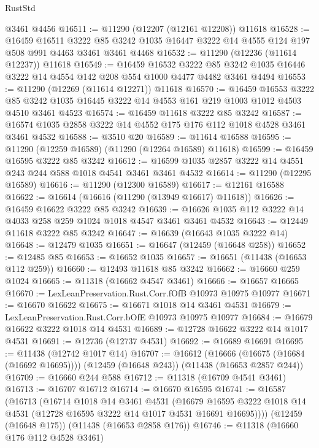 \begin{lexlean}{RustStd}
\begin{coremodule}
    @3461
    @4456
@16511 := @11290 (@12207 (@12161 @12208)) @11618
@16528 := @16459
    @16511
    @3222
    @85
    @3242
    @1035
    @16447
    @3222
    @14
    @4555
    @124
    @197
    @508
    @991
    @4463
    @3461
    @3461
    @4468
@16532 := @11290 (@12236 (@11614 @12237)) @11618
@16549 := @16459
    @16532
    @3222
    @85
    @3242
    @1035
    @16446
    @3222
    @14
    @4554
    @142
    @208
    @554
    @1000
    @4477
    @4482
    @3461
    @4494
@16553 := @11290 (@12269 (@11614 @12271)) @11618
@16570 := @16459
    @16553
    @3222
    @85
    @3242
    @1035
    @16445
    @3222
    @14
    @4553
    @161
    @219
    @1003
    @1012
    @4503
    @4510
    @3461
    @4523
@16574 := @16459 @11618 @3222 @85 @3242
@16587 := @16574 @1035 @2858 @3222 @14 @4552 @175 @176 @112 @1018 @4528 @3461 @3461 @4532
@16588 := @3510 @20
@16589 := @11614 @16588
@16595 := @11290 (@12259 @16589) (@11290 (@12264 @16589) @11618)
@16599 := @16459 @16595 @3222 @85 @3242
@16612 := @16599 @1035 @2857 @3222 @14 @4551 @243 @244 @588 @1018 @4541 @3461 @3461 @4532
@16614 := @11290 (@12295 @16589)
@16616 := @11290 (@12300 @16589)
@16617 := @12161 @16588
@16622 := @16614 (@16616 (@11290 (@13949 @16617) @11618))
@16626 := @16459 @16622 @3222 @85 @3242
@16639 := @16626 @1035 @112 @3222 @14 @4033 @258 @259 @1024 @1018 @4547 @3461 @3461 @4532
@16643 := @12449 @11618 @3222 @85 @3242
@16647 := @16639 (@16643 @1035 @3222 @14)
@16648 := @12479 @1035
@16651 := @16647 (@12459 (@16648 @258))
@16652 := @12485 @85
@16653 := @16652 @1035
@16657 := @16651 (@11438 (@16653 @112 @259))
@16660 := @12493 @11618 @85 @3242
@16662 := @16660 @259 @1024
@16665 := @11318 (@16662 @4547 @3461)
@16666 := @16657 @16665
@16670 := LexLeanPreservation.Rust.Corr.fOfB @10973 @10975 @10977
@16671 := @16670 @16622
@16675 := @16671 @1018 @14 @3461 @4531
@16679 := LexLeanPreservation.Rust.Corr.bOfE @10973 @10975 @10977
@16684 := @16679 @16622 @3222 @1018 @14 @4531
@16689 := @12728 @16622 @3222 @14 @1017 @4531
@16691 := @12736 (@12737 @4531)
@16692 := @16689 @16691
@16695 := @11438 (@12742 @1017 @14)
@16707 := @16612
    (@16666 (@16675 (@16684 (@16692 @16695))))
    (@12459 (@16648 @243))
    (@11438 (@16653 @2857 @244))
@16709 := @16660 @244 @588
@16712 := @11318 (@16709 @4541 @3461)
@16713 := @16707 @16712
@16714 := @16670 @16595
@16741 := @16587
    (@16713
      (@16714
        @1018
        @14
        @3461
        @4531
        (@16679 @16595 @3222 @1018 @14 @4531 (@12728 @16595 @3222 @14 @1017 @4531 @16691 @16695))))
    (@12459 (@16648 @175))
    (@11438 (@16653 @2858 @176))
@16746 := @11318 (@16660 @176 @112 @4528 @3461)

\end{coremodule}
\end{lexlean}

